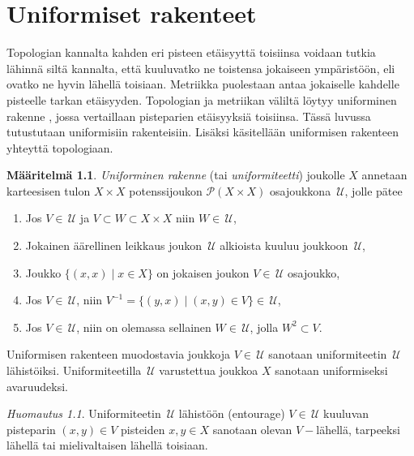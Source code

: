 \documentclass[12pt,a4paper,leqno]{report}
\newcommand{\U}{\,\mathcal{U}}
\newcommand{\Pot}{\mathcal{P}}
\theoremstyle{plain}
\theoremstyle{definition}
\newtheorem{maar}[equation]{Määritelmä}
\theoremstyle{remark}
\newtheorem{huom}[equation]{Huomautus}
\begin{document}
\chapter{Uniformiset rakenteet}
Topologian kannalta kahden eri pisteen etäisyyttä toisiinsa voidaan tutkia lähinnä siltä kannalta, että kuuluvatko ne toistensa jokaiseen ympäristöön, eli ovatko ne hyvin lähellä toisiaan. 
Metriikka puolestaan antaa jokaiselle kahdelle pisteelle tarkan etäisyyden. 
Topologian ja metriikan väliltä löytyy uniforminen rakenne \cite{Eom1}, 
jossa vertaillaan pisteparien etäisyyksiä toisiinsa. 
Tässä luvussa tutustutaan uniformisiin rakenteisiin. 
Lisäksi käsitellään uniformisen rakenteen yhteyttä topologiaan. 
\begin{maar}\label{uniformi_maar}
\emph{Uniforminen rakenne} (tai \emph{uniformiteetti}) joukolle $X$ annetaan karteesisen tulon $X\times X$ potenssijoukon $\Pot(X\times X)$ osajoukkona $\U$, jolle pätee %
\begin{enumerate} [label=(U\arabic*),ref=(U\arabic*)]
\item\label{F_I} Jos $V\in \U$ ja $V\subset W\subset X\times X$ niin $ W\in\U$,
\item\label{F_II} Jokainen äärellinen leikkaus joukon $\U$ alkioista kuuluu joukkoon $\U$,
\item\label{U_I} Joukko $\{(x,x)\mid x\in X\}$ on jokaisen joukon $V\in\U$ osajoukko,
\item\label{U_II} Jos $V\in\U$, niin $V^{-1}=\{(y,x)\mid (x,y)\in V\}\in\U$,
\item\label{U_III} Jos $V\in \U$, niin on olemassa sellainen $W\in \U$, jolla $ W^2\subset V$.%
\end{enumerate}
Uniformisen rakenteen muodostavia joukkoja $ V\in\U$ sanotaan uniformiteetin $\U$ lähistöiksi. 
Uniformiteetilla $\U$ varustettua joukkoa $X$ sanotaan uniformiseksi avaruudeksi.
\end{maar}
\begin{huom}\label{V-close}
Uniformiteetin $\U$ lähistöön (entourage) $V\in\U $ kuuluvan 
pisteparin $(x,y)\in V$ pisteiden $x,y\in X$ sanotaan olevan $V-$lähellä, 
tarpeeksi lähellä tai mielivaltaisen lähellä toisiaan.
\end{huom}
\end{document}

